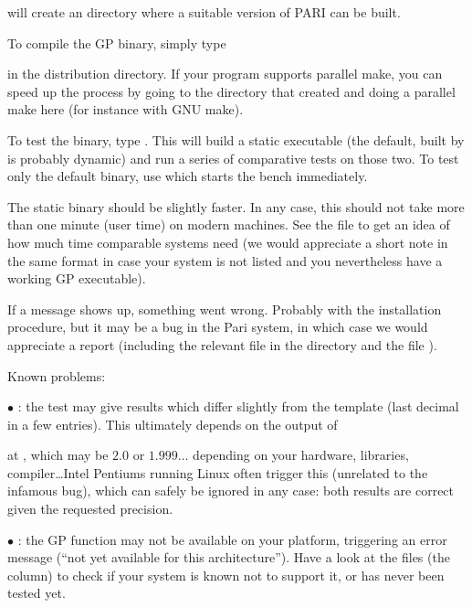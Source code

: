 
\noindent will create an  directory where a suitable version
of PARI can be built.

 To compile the GP binary, simply type


\noindent in the distribution directory. If your  program supports
parallel make, you can speed up the process by going to the 
directory that  created and doing a parallel make here (for
instance  with GNU make).


To test the binary, type . This will build a static
executable (the default, built by  is probably dynamic) and
run a series of comparative tests on those two. To test only the default
binary, use  which starts the bench immediately.

The static binary should be slightly faster. In any case, this should not
take more than one minute (user time) on modern machines. See the file
 to get an idea of how much time comparable systems need (we
would appreciate a short note in the same format in case your system is not
listed and you nevertheless have a working GP executable).

If a \kbd{[BUG]} message shows up, something went wrong. Probably with the
installation procedure, but it may be a bug in the Pari system, in which
case we would appreciate a report (including the relevant  file
in the  directory and the file ).

\noindent Known problems:

$\bullet$ : the test 
may give results which differ slightly from the template (last decimal in a
few entries). This ultimately depends on the output of


\noindent at , which may be $2.0$ or $1.999\dots$ depending on
your hardware, libraries, compiler\dots Intel Pentiums running Linux often
trigger this  (unrelated to the infamous  bug), which
can safely be ignored in any case: both results are correct given the
requested precision.

$\bullet$ : the GP function  may not be available on
your platform, triggering an error message (``not yet available for this
architecture''). Have a look at the  files (the 
column) to check if your system is known not to support it, or has never
been tested yet.

